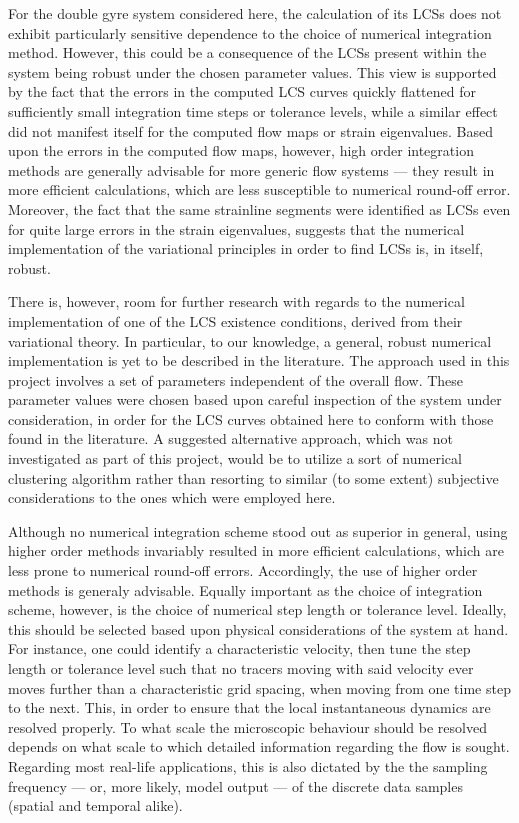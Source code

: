 For the double gyre system considered here, the calculation of its LCSs
does not exhibit particularly sensitive dependence to
the choice of numerical integration method. However, this could be a
consequence of the LCSs present within the system being robust under the chosen
parameter values. This view is supported by the fact that the errors in the
computed LCS curves quickly flattened for sufficiently small integration time
steps or tolerance levels, while a similar effect did not manifest itself for
the computed flow maps or strain eigenvalues. Based upon the errors in the
computed flow maps, however, high order integration methods are generally
advisable for more generic flow systems --- they result in more efficient
calculations, which are less susceptible to numerical round-off error.
Moreover, the fact that the same strainline segments were identified as LCSs
even for quite large errors in the strain eigenvalues, suggests that the
numerical implementation of the variational principles in order to find LCSs is,
in itself, robust.

There is, however, room for further research with regards to the numerical
implementation of one of the LCS existence conditions, derived from their
variational theory. In particular, to our knowledge, a general, robust numerical
implementation is yet to be described in the literature. The approach used
in this project involves a set of parameters independent of the overall flow.
These parameter values were chosen based upon careful inspection of the
system under consideration, in order for the LCS curves obtained here to
conform with those found in the literature. A suggested alternative approach,
which was not investigated as part of this project, would be to utilize a sort
of numerical clustering algorithm rather than resorting to similar
(to some extent) subjective considerations to the ones which were employed here.

Although no numerical integration scheme stood out as superior in general,
using higher order methods invariably resulted in more efficient calculations,
which are less prone to numerical round-off errors. Accordingly, the use of
higher order methods is generaly advisable. Equally important as the choice of
integration scheme, however, is the choice of numerical step length or tolerance
level. Ideally, this should be selected based upon physical considerations of
the system at hand. For instance, one could identify a characteristic velocity,
then tune the step length or tolerance level such that no tracers moving with
said velocity ever moves further than a characteristic grid spacing, when
moving from one time step to the next. This, in order to ensure that the local
instantaneous dynamics are resolved properly. To what scale the microscopic
behaviour should be resolved depends on what scale to which detailed information
regarding the flow is sought. Regarding most real-life applications, this is
also dictated by the the sampling frequency --- or, more likely, model output
--- of the discrete data samples (spatial and temporal alike).

